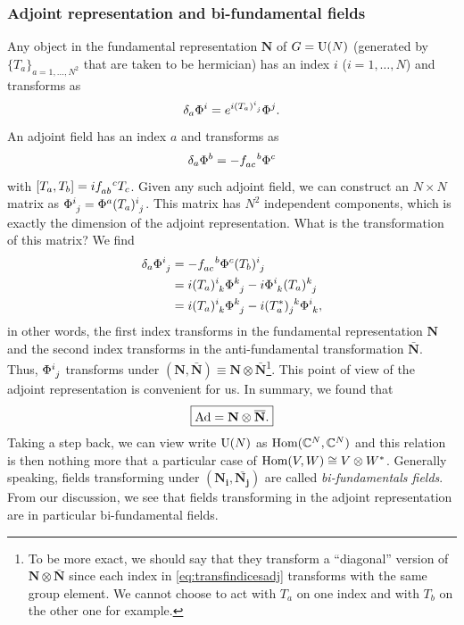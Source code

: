         \subsubsection{Adjoint representation and bi-fundamental fields}

            Any object in the fundamental representation $\textbf{N}$ of $G=\text{U}(N)$ (generated by $\{T_a\}_{a=1,\dots,N^2}$ that are taken to be hermician) has an index $i$ ($i=1,\dots,N$) and transforms as
            \begin{equation}
                \delta_a\Phi^i= e^{i(T_a)\indices{^i_j}}\Phi^j.
            \end{equation}
            An adjoint field has an index $a$ and transforms as
            \begin{equation}
                \delta_a\Phi^b = -f\indices{_{ac}^b}\Phi^c
            \end{equation}
            with $[T_a,T_b]=if\indices{_{ab}^c}T_c$. Given any such adjoint field, we can construct an $N\times N$ matrix as $\Phi\indices{^i_j}=\Phi^a (T_a)\indices{^i_j}$. This matrix has $N^2$ independent components, which is exactly the dimension of the adjoint representation. What is the transformation of this matrix? We find
            \begin{align}
                \delta_a\Phi\indices{^i_j}&=-f\indices{_{ac}^b}\Phi^c (T_b)\indices{^i_j}\\
                &= i(T_a)\indices{^i_k}\Phi\indices{^k_j}-i\Phi\indices{^i_k}(T_a)\indices{^k_j}\\
                &= i(T_a)\indices{^i_k}\Phi\indices{^k_j}-i(T^*_a)\indices{_j^k}\Phi\indices{^i_k},\label{eq:transfindicesadj}
            \end{align}
            in other words, the first index transforms in the fundamental representation $\textbf{N}$ and the second index transforms in the anti-fundamental transformation $\bar{\textbf{N}}$. Thus, $\Phi\indices{^i_j}$ transforms under $(\textbf{N},\bar{\textbf{N}})\equiv\textbf{N}\otimes\bar{\textbf{N}}$\footnote{To be more exact, we should say that they transform a ``diagonal'' version of $\textbf{N}\otimes\bar{\textbf{N}}$ since each index in \eqref{eq:transfindicesadj} transforms with the same group element. We cannot choose to act with $T_a$ on one index and with $T_b$ on the other one for example.}. This point of view of the adjoint representation is convenient for us. In summary, we found that
            \begin{equation}
                \boxed{\text{Ad} = \textbf{N}\otimes\overline{\textbf{N}}.}\label{eq:bufundadjoint}
            \end{equation}
            Taking a step back, we can view write $\text{U}(N)$ as $\text{Hom}(\mathbb{C}^N,\mathbb{C}^N)$ and this relation is then nothing more that a particular case of $\text{Hom}(V,W)\cong V\otimes W^*$. Generally speaking, fields transforming under $(\boldsymbol{\textbf{N}_i},\bar{\boldsymbol{\textbf{N}_j}})$ are called \emph{bi-fundamentals fields}. From our discussion, we see that fields transforming in the adjoint representation are in particular bi-fundamental fields.

